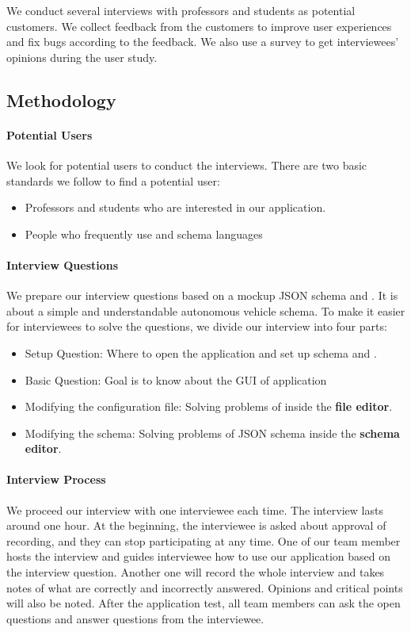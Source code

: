 We conduct several interviews with professors and students as potential customers.
We collect feedback from the customers to improve user experiences and fix bugs according to the feedback.
We also use a survey to get interviewees' opinions during the user study.

\subsection{Methodology}\label{subsec:methodology}

\paragraph{Potential Users}
We look for potential users to conduct the interviews.
There are two basic standards we follow to find a potential user:
\begin{itemize}
    \item Professors and students who are interested in our application.
    \item People who frequently use \cfgfiles and schema languages
\end{itemize}

\paragraph{Interview Questions}
We prepare our interview questions based on a mockup JSON schema and \cfgfiles.
It is about a simple and understandable autonomous vehicle schema.
To make it easier for interviewees to solve the questions, we divide our interview into four parts:
\begin{itemize}
    \item Setup Question: Where to open the application and set up schema and \cfgfiles.
    \item Basic Question: Goal is to know about the GUI of application
    \item Modifying the configuration file: Solving problems of \cfgfiles inside the \textbf{file editor}.
    \item Modifying the schema: Solving problems of JSON schema inside the \textbf{schema editor}.
\end{itemize}

\paragraph{Interview Process}
We proceed our interview with one interviewee each time.
The interview lasts around one hour.
At the beginning, the interviewee is asked about approval of recording, and they can stop participating at any time.
One of our team member hosts the interview and guides interviewee how to use our application based on the interview question.
Another one will record the whole interview and takes notes of what are correctly and incorrectly answered.
Opinions and critical points will also be noted.
After the application test, all team members can ask the open questions and answer questions from the interviewee.

